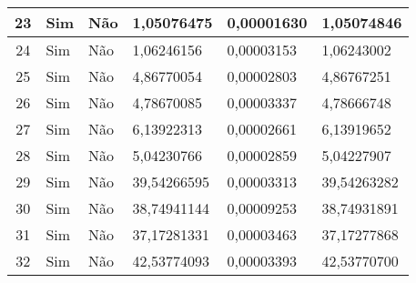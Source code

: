 \documentclass[openany]{ufsctex/ufsctex}
\begin{document}
\begin{longtable}{|c|p{1cm}|p{1cm}|p{2cm}|p{2cm}|p{2cm}|}
23 & Sim & Não & 1,05076475 & 0,00001630 & 1,05074846\\ \hline 
24 & Sim & Não & 1,06246156 & 0,00003153 & 1,06243002\\ \hline 
25 & Sim & Não & 4,86770054 & 0,00002803 & 4,86767251\\ \hline 
26 & Sim & Não & 4,78670085 & 0,00003337 & 4,78666748\\ \hline 
27 & Sim & Não & 6,13922313 & 0,00002661 & 6,13919652\\ \hline 
28 & Sim & Não & 5,04230766 & 0,00002859 & 5,04227907\\ \hline 
29 & Sim & Não & 39,54266595 & 0,00003313 & 39,54263282\\ \hline 
30 & Sim & Não & 38,74941144 & 0,00009253 & 38,74931891\\ \hline 
31 & Sim & Não & 37,17281331 & 0,00003463 & 37,17277868\\ \hline 
32 & Sim & Não & 42,53774093 & 0,00003393 & 42,53770700\\ \hline  
 \end{longtable}
 
 
 	
\end{document}
